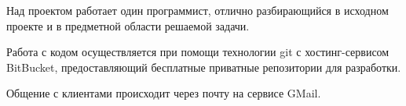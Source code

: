 Над проектом работает один программист, отлично разбирающийся в исходном проекте и в предметной области решаемой задачи.

Работа с кодом осуществляется при помощи технологии git с хостинг-сервисом BitBucket, предоставляющий бесплатные приватные репозитории для разработки.

Общение с клиентами происходит через почту на сервисе GMail.
